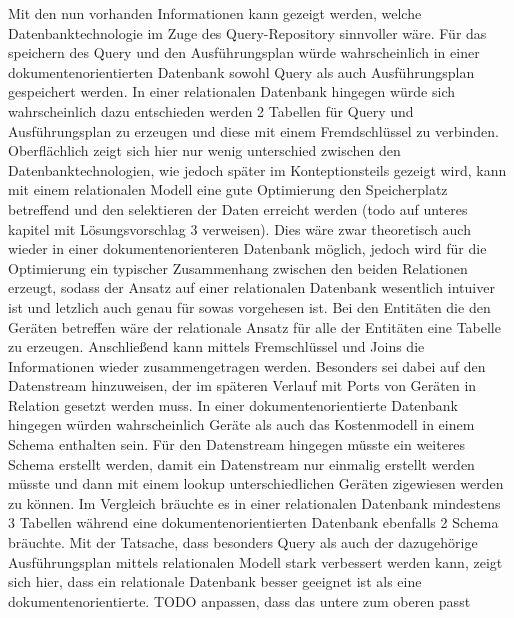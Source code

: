 Mit den nun vorhanden Informationen kann gezeigt werden, welche Datenbanktechnologie im Zuge des Query-Repository sinnvoller wäre. 
Für das speichern des Query und den Ausführungsplan würde wahrscheinlich in einer dokumentenorientierten Datenbank sowohl Query als auch Ausführungsplan gespeichert werden. In einer relationalen Datenbank hingegen würde sich wahrscheinlich dazu entschieden werden 2 Tabellen für  Query und Ausführungsplan zu erzeugen und diese mit einem Fremdschlüssel zu verbinden. Oberflächlich zeigt sich hier nur wenig unterschied zwischen den Datenbanktechnologien, wie jedoch später im Konteptionsteils gezeigt wird, kann mit einem relationalen Modell eine gute Optimierung den Speicherplatz betreffend und den selektieren der Daten erreicht werden (todo auf unteres kapitel mit Lösungsvorschlag 3 verweisen). Dies wäre zwar theoretisch auch wieder in einer dokumentenorienteren Datenbank möglich, jedoch wird für die Optimierung ein typischer Zusammenhang zwischen den beiden Relationen erzeugt, sodass der Ansatz auf einer relationalen Datenbank wesentlich intuiver ist und letzlich auch genau für sowas vorgehesen ist.
Bei den Entitäten die den Geräten betreffen wäre der relationale Ansatz für alle der Entitäten eine Tabelle zu erzeugen. Anschließend kann mittels Fremschlüssel und Joins die Informationen wieder zusammengetragen werden. Besonders sei dabei auf den Datenstream hinzuweisen, der im späteren Verlauf mit Ports von Geräten in Relation gesetzt werden muss.
In einer dokumentenorientierte Datenbank hingegen würden wahrscheinlich Geräte als auch das Kostenmodell in einem Schema enthalten sein. Für den Datenstream hingegen müsste ein weiteres Schema erstellt werden, damit ein Datenstream nur einmalig erstellt werden müsste und dann mit einem lookup unterschiedlichen Geräten zigewiesen werden zu können. Im Vergleich bräuchte es in einer relationalen Datenbank mindestens 3 Tabellen während eine dokumentenorientierten Datenbank ebenfalls 2 Schema bräuchte.
Mit der Tatsache, dass besonders Query als auch der dazugehörige Ausführungsplan mittels relationalen Modell stark verbessert werden kann, zeigt sich hier, dass ein relationale Datenbank besser geeignet ist als eine dokumentenorientierte.
TODO anpassen, dass das untere zum oberen passt
